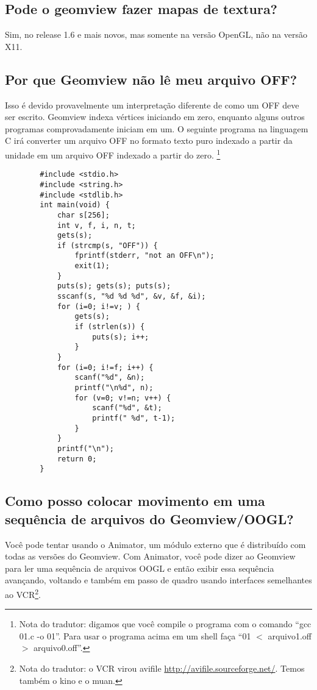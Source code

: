 \documentclass[12pt,a4paper]{article}
\begin{document}
    \subsection{Pode o geomview fazer mapas de textura?}

        Sim, no release 1.6 e mais novos, mas somente na vers\~ao OpenGL, n\~ao na
        vers\~ao X11.

    \subsection{Por que Geomview n\~ao l\^e meu arquivo OFF?}

        Isso \'e devido provavelmente um interpreta\c{c}\~ao diferente de como um OFF deve
        ser escrito. Geomview indexa v\'ertices iniciando em zero, enquanto alguns outros
        programas comprovadamente iniciam em um. O seguinte programa na linguagem C ir\'a converter
        um arquivo OFF no formato texto puro indexado a partir da unidade em um arquivo OFF indexado a partir do zero.
        \footnote{Nota do tradutor: digamos que voc\^e compile o programa com o comando
        ``gcc 01.c -o 01''. Para usar o programa acima em um shell fa\c{c}a ``01 $<$ arquivo1.off $>$ arquivo0.off''.}
        \begin{verbatim}
        #include <stdio.h>
        #include <string.h>
        #include <stdlib.h>
        int main(void) {
            char s[256];
            int v, f, i, n, t;
            gets(s);
            if (strcmp(s, "OFF")) {
                fprintf(stderr, "not an OFF\n");
                exit(1);
            }
            puts(s); gets(s); puts(s);
            sscanf(s, "%d %d %d", &v, &f, &i);
            for (i=0; i!=v; ) {
                gets(s);
                if (strlen(s)) {
                    puts(s); i++;
                }
            }
            for (i=0; i!=f; i++) {
                scanf("%d", &n);
                printf("\n%d", n);
                for (v=0; v!=n; v++) {
                    scanf("%d", &t);
                    printf(" %d", t-1);
                }
            }
            printf("\n");
            return 0;
        }
        \end{verbatim}

    \subsection{Como posso colocar movimento em uma sequ\^encia de arquivos do Geomview/OOGL?}

        Voc\^e pode tentar usando o Animator, um m\'{o}dulo externo que \'e distribu\'ido
        com todas as vers\~oes do Geomview. Com Animator, voc\^e pode dizer ao Geomview para
        ler uma sequ\^encia de arquivos OOGL e ent\~ao exibir essa sequ\^encia
        avan\c{c}ando, voltando e tamb\'em em passo de quadro usando interfaces semelhantes ao
        VCR\footnote{Nota do tradutor: o VCR virou avifile \url{http://avifile.sourceforge.net/}.
        Temos tamb\'em o kino e o muan.}.
\end{document}

